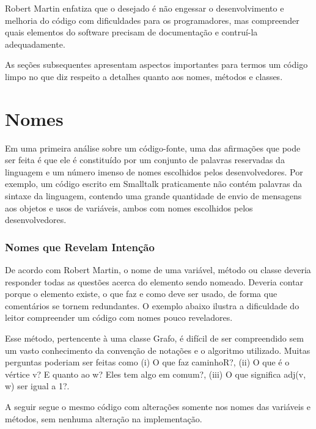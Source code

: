Robert Martin enfatiza que o desejado é não engessar o desenvolvimento e melhoria do código com dificuldades para os programadores, mas compreender quais elementos do software precisam de documentação e contruí-la adequadamente.

\vskip 1.0cm
As seções subsequentes apresentam aspectos importantes para termos um código limpo no que diz respeito a detalhes quanto aos nomes, métodos e classes.

\section{Nomes}
\label{sec:nomes}

Em uma primeira análise sobre um código-fonte, uma das afirmações que pode ser feita é que ele é constituído por um conjunto de palavras reservadas da linguagem e um número imenso de nomes escolhidos pelos desenvolvedores. Por exemplo, um código escrito em Smalltalk praticamente não contém palavras da sintaxe da linguagem, contendo uma grande quantidade de envio de mensagens aos objetos e usos de variáveis, ambos com nomes escolhidos pelos desenvolvedores.

\subsubsection{Nomes que Revelam Intenção}
De acordo com Robert Martin, o nome de uma variável, método ou classe deveria responder todas as questões acerca do elemento sendo nomeado. Deveria contar porque o elemento existe, o que faz e como deve ser usado, de forma que comentários se tornem redundantes. O exemplo abaixo ilustra a dificuldade do leitor compreender um código com nomes pouco reveladores.



Esse método, pertencente à uma classe Grafo, é difícil de ser compreendido sem um vasto conhecimento da convenção de notações e o algoritmo utilizado. Muitas perguntas poderiam ser feitas como (i) O que faz caminhoR?,  (ii) O que é o vértice v?  E quanto ao w? Eles tem algo em comum?, (iii)  O que significa adj(v, w) ser igual a 1?.

A seguir segue o mesmo código com alterações somente nos nomes das variáveis e métodos, sem nenhuma alteração na implementação.




